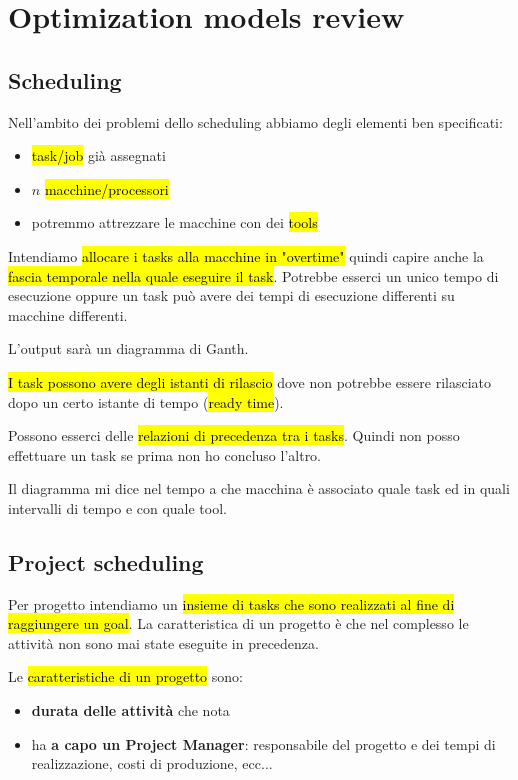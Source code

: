 \newpage
\section{Optimization models review}

\subsection{Scheduling}

Nell'ambito dei problemi dello scheduling abbiamo degli elementi ben specificati:

\begin{itemize}
	\item \hl{task/job} già assegnati
	\item $n$ \hl{macchine/processori}
	\item potremmo attrezzare le macchine con dei \hl{tools}
\end{itemize}

Intendiamo \hl{allocare i tasks alla macchine in "overtime"} quindi capire anche la \hl{fascia temporale nella quale eseguire il task}. Potrebbe esserci un unico tempo di esecuzione oppure un task può avere dei tempi di esecuzione differenti su macchine differenti. 

L'output sarà un diagramma di Ganth.

\hl{I task possono avere degli istanti di rilascio} dove non potrebbe essere rilasciato dopo un certo istante di tempo (\hl{ready time}).

Possono esserci delle \hl{relazioni di precedenza tra i tasks}. Quindi non posso effettuare un task se prima non ho concluso l'altro.

Il diagramma mi dice nel tempo a che macchina è associato quale task ed in quali intervalli di tempo e con quale tool.


\subsection{Project scheduling}

Per progetto intendiamo un \hl{insieme di tasks che sono realizzati al fine di raggiungere un goal}. La caratteristica di un progetto è che nel complesso le attività non sono mai state eseguite in precedenza.

Le \hl{caratteristiche di un progetto} sono:


\begin{itemize}
	\item \textbf{durata delle attività} che nota
	\item ha \textbf{a capo un Project Manager}: responsabile del progetto e dei tempi di realizzazione, costi di produzione, ecc...
\end{itemize}

